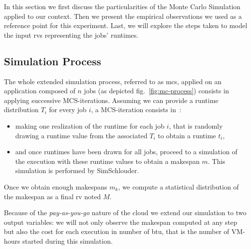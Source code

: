 \documentclass[10pt,conference,compsocconf]{IEEEtran}
\begin{document}
In  this  section we  first  discuss  the  particularities  of the  Monte  Carlo
Simulation applied to our context. Then we present the empirical observations we
used as a reference point for this experiment. Last, we will explore the steps
taken to model the input \acp{rv} representing the jobs' runtimes.

\subsection{Simulation Process}

The whole extended simulation process,  referred to as \ac{mcs}, applied on an
application composed of $n$ jobs (as depicted fig.~\ref{fig:mc-process})
consists in applying successive MCS-iterations. Assuming we can provide a
runtime distribution $T_i$ for every job $i$, a MCS-iteration consists in~:
\begin{itemize}
\item making one realization of the runtime  for each job $i$, that is randomly
  drawing a runtime value from the associated $T_i$ to obtain a runtime $t_i$,
\item and once runtimes have been drawn for all jobs, proceed to a simulation
  of the execution with these runtime values to obtain a makespan $m$. 
 This simulation is performed by SimSchlouder.
\end{itemize}
Once we obtain enough makespans $m_k$, we compute  a statistical distribution of
the makespan  as a final \ac{rv} noted $M$.


Because of the \emph{pay-as-you-go} nature of the cloud we extend our simulation
to two output variables: we will not only observe the makespan computed at any
step but also the cost for each execution in number of \ac{btu}, that is the
number of VM-hours started during this simulation.
\end{document}

